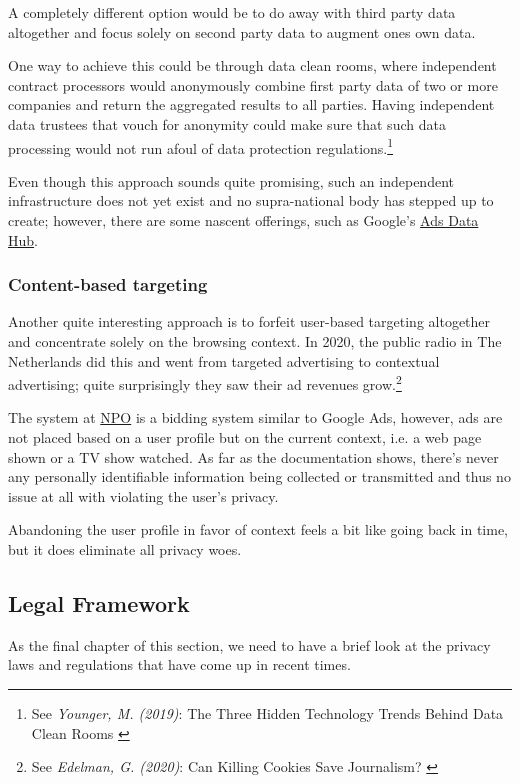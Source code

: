 A completely different option would be to do away with third party data altogether and focus solely on second party data to augment ones own data. 

One way to achieve this could be through data clean rooms, where independent contract processors would anonymously combine first party data of two or more companies and return the aggregated results to all parties. Having independent data trustees that vouch for anonymity could make sure that such data processing would not run afoul of data protection regulations.\footnote{See \textit{Younger, M. (2019)}: The Three Hidden Technology Trends Behind Data Clean Rooms \cite{cleanRoom}}

Even though this approach sounds quite promising, such an independent infrastructure does not yet exist and no supra-national body has stepped up to create; however, there are some nascent offerings, such as Google's \href{https://developers.google.com/ads-data-hub}{Ads Data Hub}.

\subsubsection{Content-based targeting}

Another quite interesting approach is to forfeit user-based targeting altogether and concentrate solely on the browsing context. In 2020, the public radio in The Netherlands did this and went from targeted advertising to contextual advertising; quite surprisingly they saw their ad revenues grow.\footnote{See \textit{Edelman, G. (2020)}: Can Killing Cookies Save Journalism? \cite{killingCookies}} 

The system at \href{https://over.npo.nl/}{NPO} is a bidding system similar to Google Ads, however, ads are not placed based on a user profile but on the current context, i.e. a web page shown or a TV show watched. As far as the documentation shows, there's never any personally identifiable information being collected or transmitted and thus no issue at all with violating the user's privacy.

Abandoning the user profile in favor of context feels a bit like going back in time, but it does eliminate all privacy woes.

\subsection{Legal Framework}

As the final chapter of this section, we need to have a brief look at the privacy laws and regulations that have come up in recent times. 

